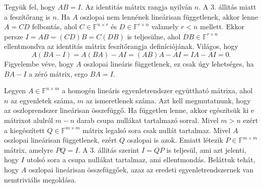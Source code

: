 \documentclass[9pt,showtrims]{memoir}
\makeatletter
\renewenvironment{proof}[1][\proofname]
    {\par\pushQED{\qed}%
    \normalfont \topsep6\p@\@plus6\p@\relax
    \trivlist
    \item[\hskip\labelsep
        \itshape
    #1\@addpunct{:}]\ignorespaces}
    {\popQED\endtrivlist\@endpefalse}
\theoremstyle{plain}
\theoremstyle{remark}
\theoremstyle{definition}
\makeatother
\begin{document}
\begin{proof}[3.\Rightarrow 4.]
    Tegyük fel, hogy $AB=I$.
    Az identitás mátrix rangja nyilván $n$.
    A 3. állitás miatt a feszítőrang is $n$.
    Ha $A$ oszlopai nem lennének lineárisan függetlenek,
    akkor lenne $A=CD$ felbontás, ahol $C\in\mathbb{F}^{n \times r}$ és $D\in\mathbb{F}^{r\times n}$ valamely $r<n$ mellett.
    Ekkor persze $I=AB=\left( CD \right)B=C\left( DB \right)$ is teljesülne, 
    ahol $DB\in\mathbb{F}^{r\times n}$ ellentmondva az identitás mátrix feszítőrangja definíciójának.
    Világos, hogy
    \[
        A\left( BA-I \right)=
        A\left( BA \right)-AI=
        \left( AB \right)A-AI=IA-AI=0.
    \]
    Figyelembe véve, hogy $A$ oszlopai lineáris függetlenek, ez csak úgy lehetséges, ha $BA-I$ a zéró mátrix, ergo $BA=I$.
\end{proof}
\begin{proof}[4.\Rightarrow 1.]
    Legyen $A\in\mathbb{F}^{n\times m}$ a homogén lineáris egyenletrendszer együttható mátrixa,
    ahol $n$ az egyenletek száma, $m$ az ismeretlenek száma.
    Azt kell megmutatnunk, hogy az oszloprendszer lineárisan összefüggő.
    Ha független lenne, akkor
    egészítsük ki e mátrixot alulról $m-n$ darab csupa nullákat tartalmazó sorral.
    Mivel $m>n$ ezért a kiegészített $Q\in\mathbb{F}^{m\times m}$ mátrix legalsó sora csak nullát tartalmaz.
    Mivel $A$ oszlopai lineárisan függetlenek, ezért $Q$ oszlopai is azok.
    Emiatt létezik $P\in\mathbb{F}^{m\times m}$ mátrix, amelyre $PQ=I$.
    A 3. állitás szerint $I=QP$ is teljesül, 
    ami azt jelenti, hogy $I$ utolsó sora a csupa nullákat tartalmaz, ami ellentmondás.
    Beláttuk tehát, hogy $A$ oszlopai lineárisan összefüggőek, azaz az eredeti egyenletrendszernek van nemtriviális megoldása.
\end{proof}

\backmatter
\pagestyle{empty}

\printindex
\end{document}
